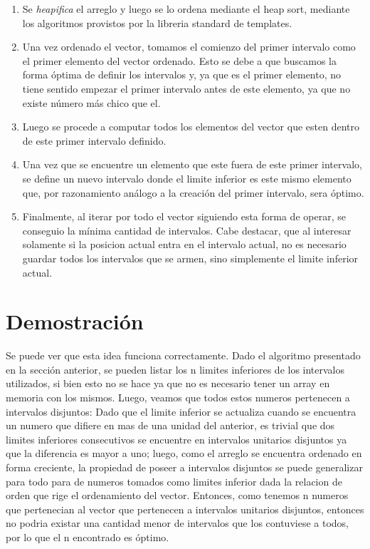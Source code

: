 \documentclass[a4paper, 12pt] {article}
\begin{document}
\begin{enumerate}
 \item Se \emph{heapifica} el arreglo y luego se lo ordena mediante el heap sort, mediante los algoritmos provistos por la libreria standard de templates.
\item Una vez ordenado el vector, tomamos el comienzo del primer intervalo como el primer elemento del vector ordenado. Esto se debe a que buscamos la forma \'optima de definir los intervalos y, ya que es el primer elemento, no tiene sentido empezar el primer intervalo antes de este elemento, ya que no existe n\'umero m\'as chico que el.
\item Luego se procede a computar todos los elementos del vector que esten dentro de este primer intervalo definido.
\item Una vez que se encuentre un elemento que este fuera de este primer intervalo, se define un nuevo intervalo donde el limite inferior es este mismo elemento que, por razonamiento an\'alogo a la creaci\'on del primer intervalo, sera \'optimo.
\item Finalmente, al iterar por todo el vector siguiendo esta forma de operar, se conseguio la m\'inima cantidad de intervalos. Cabe destacar, que al interesar solamente si la posicion actual entra en el intervalo actual, no es necesario guardar todos los intervalos que se armen, sino simplemente el limite inferior actual.
\end{enumerate}

\section*{Demostraci\'on}
Se puede ver que esta idea funciona correctamente. Dado el algoritmo presentado en la secci\'on anterior, se pueden listar los n limites inferiores de los intervalos utilizados, si bien esto no se hace ya que no es necesario tener un array en memoria con los mismos. Luego, veamos que todos estos numeros pertenecen a intervalos disjuntos: Dado que el limite inferior se actualiza cuando se encuentra un numero que difiere en mas de una unidad del anterior, es trivial que dos limites inferiores consecutivos se encuentre en intervalos unitarios disjuntos ya que la diferencia es mayor a uno; luego, como el arreglo se encuentra ordenado en forma creciente, la propiedad de poseer a intervalos disjuntos se puede generalizar para todo para de numeros tomados como limites inferior dada la relacion de orden que rige el ordenamiento del vector. Entonces, como tenemos n numeros que pertenecian al vector que pertenecen a intervalos unitarios disjuntos, entonces no podria existar una cantidad menor de intervalos que los contuviese a todos, por lo que el n encontrado es \'optimo.
\end{document}
